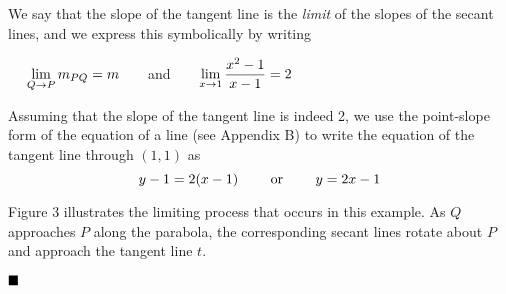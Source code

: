 \documentclass{sebase}
\begin{document}
\begin{Solution}
We say that the slope of the tangent line is the \textit{limit} of the
slopes of the secant lines, and we express this symbolically by
writing\bigskip

$\hfill \hspace{13pt}\lim\limits_{Q\rightarrow P}m_{PQ}=m\qquad $and$\qquad
\lim\limits_{x\rightarrow 1}\dfrac{x^{2}-1}{x-1}=2\hfill $\bigskip

Assuming that the slope of the tangent line is indeed 2, we
use the point-slope form of the equation of a line (see Appendix B) to write
the equation of the tangent line through $(1,1)$ as 
\begin{equation*}
y-1=2(x-1)\text{ \qquad or \qquad }y=2x-1
\end{equation*}

Figure 3 illustrates the limiting process that occurs in this example. As $Q$
approaches $P$ along the parabola, the corresponding secant lines rotate
about $P$ and approach the tangent line $t$.

\vspace{12pt}\hskip-190pt\hfil%
%
\vspace{12pt}\hfil%
\vspace{-24pt}

$\hfill \vspace{-12pt}\blacksquare $
\end{Solution}
\end{document}
